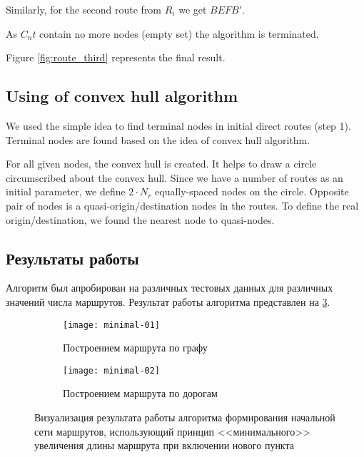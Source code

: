 Similarly, for the second route from \( R_i \) we get \( BEFB' \).

As \( C_nt \) contain no more nodes (empty set) the algorithm is terminated. 

Figure \ref{fig:route_third} represents the final result.

\subsection{Using of convex hull algorithm}
We used the simple idea to find terminal nodes in initial direct routes (step 1). Terminal nodes are found 
based on  the idea of convex hull algorithm. 

For all given nodes, the convex hull is created. It helps to draw a circle circumscribed about the convex 
hull. Since we have a number of routes as an initial parameter, we define \( 2\cdot N_r \) equally-spaced 
nodes on the circle. Opposite pair of nodes is a quasi-origin/destination nodes in the routes. To define 
the real origin/destination, we found the nearest node to quasi-nodes.

\subsection{Результаты работы}
Алгоритм был апробирован на различных тестовых данных для различных значений числа маршрутов. 
Результат работы алгоритма представлен на \ref{img:min-length-01}.
\begin{figure}[h!]
    \centering
    \begin{subfigure}{0.47\textwidth}
        \texttt{[image: minimal-01]}
        \caption{Построением маршрута по графу}
        \label{fig:graph}
    \end{subfigure}
    \begin{subfigure}{0.47\textwidth}
        \texttt{[image: minimal-02]}
        \caption{Построением маршрута по дорогам}
        \label{fig:osrm}
    \end{subfigure}
    \caption{Визуализация результата работы алгоритма формирования начальной сети маршрутов, 
        использующий принцип <<минимального>> увеличения длины маршрута при включении нового пункта%
    }
   \label{img:min-length-01}
\end{figure}

